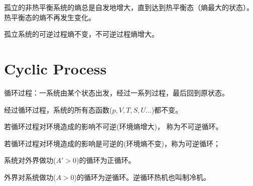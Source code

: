 \documentclass[CJK]{beamer}
\begin{document}
\begin{frame}
\bchL

\bitem
\item{\blue 孤立的非热平衡系统的熵总是自发地增大，直到达到热平衡态（熵最大的状态）。热平衡态的熵不再发生变化。}
\item{\blue 孤立系统的可逆过程熵不变，不可逆过程熵增大。}
\eitem


\echL
\end{frame}


\section{Cyclic Process}

\begin{frame}
\bch
{}
\ech
\end{frame}

\begin{frame}
\bchL
{\blue 循环过程}：一系统由某个状态出发，经过一系列过程，最后{\blue 回到原状态。}

\emini
{}
{\blue 经过循环过程，系统的所有态函数($p, V, T, S, U\ldots$)都不变。}
\emini
\echL
\end{frame}


\begin{frame}
\bchL



\emini
{}
\emini

\bitem
\item{若循环过程对环境造成的影响不可逆(环境熵增大)， {\blue 称为不可逆循环}。}
\item{若循环过程对环境造成的影响是可逆的(环境熵不变)，称为{\blue 可逆循环}；}
\eitem
\echL
\end{frame}

\begin{frame}
\bchL

系统对外界做功($A'>0$)的循环为正循环。

\echL
\end{frame}

\begin{frame}
\bchL

外界对系统做功($A>0$)的循环为逆循环。逆循环热机也叫制冷机。

\echL
\end{frame}
\end{document}
